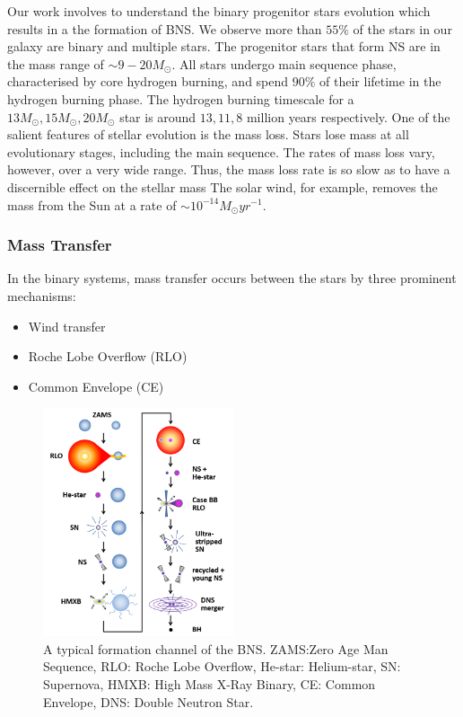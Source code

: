 \documentclass[preprint,12pt]{elsarticle}
\begin{document}
Our work involves to understand the binary progenitor stars evolution which results in a the formation of BNS. We observe more than $55\%$ of the stars in our galaxy are binary and multiple stars\citep{Sana:2012}. The progenitor stars that form NS are in the mass range of $\sim 9-20 M_{\odot}$. All stars undergo main sequence phase, characterised by core hydrogen burning, and spend $90\%$ of their lifetime in the hydrogen burning phase. The hydrogen burning timescale for a $13M_\odot, 15M_\odot, 20M_\odot$ star is  around $13, 11, 8$ million years respectively\citep{Woosley:2002}. One of the salient features of stellar evolution is the mass loss. Stars lose mass at all evolutionary stages, including the main sequence. The rates of mass loss vary, however, over a very wide range. Thus, the mass loss rate is so slow as to have a discernible effect on the stellar mass The solar wind, for example, removes the mass from the Sun at a rate of $\sim 10^{-14}M_\odot yr^{-1}$\citep{Dina:2009}. 

\subsubsection{\textbf{Mass Transfer}}
In the binary systems, mass transfer occurs between the stars by three prominent mechanisms:\newline
\begin{itemize}
    \item Wind transfer
    \item Roche Lobe Overflow (RLO)
    \item Common Envelope (CE)
\end{itemize}

\begin{figure}[htp]
    \centering
    \includegraphics[width=0.5\textwidth]{Images/x1.png}
    \caption{A typical formation channel of the BNS\citep{Tauris:2017}. ZAMS:Zero Age Man Sequence, RLO: Roche Lobe Overflow, He-star: Helium-star, SN: Supernova, HMXB: High Mass X-Ray Binary, CE: Common Envelope, DNS: Double Neutron Star.}
    \label{img:Formation channeel DNS}
\end{figure}
\end{document}
